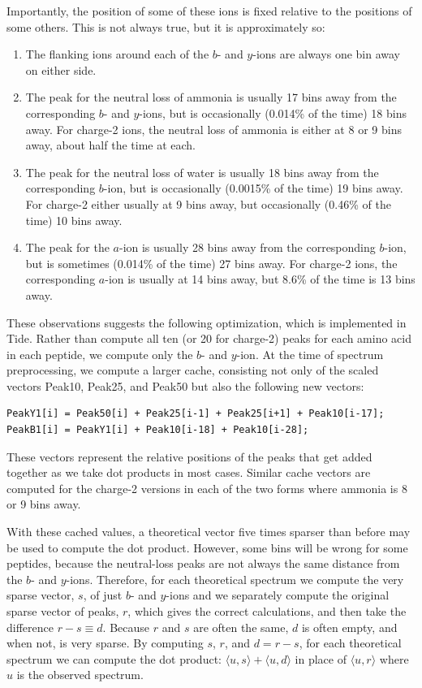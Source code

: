 Importantly, the position of some of these ions is fixed relative
to the positions of some others. This is not always true, but it is
approximately so:
\begin{enumerate}
\item The flanking ions around each of the $b$- and $y$-ions are always
  one bin away on either side.
\item The peak for the neutral loss of ammonia is usually 17 bins away
  from the corresponding $b$- and $y$-ions, but is occasionally (0.014\%
  of the time) 18 bins away. For charge-2 ions, the neutral loss of
  ammonia is either at 8 or 9 bins away, about half the time at each.
\item The peak for the neutral loss of water is usually 18 bins away
  from the corresponding $b$-ion, but is occasionally (0.0015\% of the
  time) 19 bins away. For charge-2 %
  either usually at 9 bins away, but occasionally (0.46\% of the time)
  10 bins away.
\item The peak for the $a$-ion is usually 28 bins away from the
  corresponding $b$-ion, but is sometimes (0.014\% of the time) 27 bins
  away. For charge-2 ions, the corresponding $a$-ion is usually at 14
  bins away, but 8.6\% of the time is 13 bins away.
\end{enumerate}
These observations suggests the following optimization, which is implemented in
Tide. Rather than compute all ten (or 20 for charge-2) peaks for each
amino acid in each peptide, we compute only the $b$- and $y$-ion. At the
time of spectrum preprocessing, we compute a larger cache, consisting
not only of the scaled vectors Peak10, Peak25, and Peak50 but also the
following new vectors:
\begin{verbatim}
PeakY1[i] = Peak50[i] + Peak25[i-1] + Peak25[i+1] + Peak10[i-17];
PeakB1[i] = PeakY1[i] + Peak10[i-18] + Peak10[i-28];
\end{verbatim}
These vectors represent the relative positions of the peaks that get added
together as we take dot products in most cases. Similar cache vectors
are computed for the charge-2 versions in each of the two forms where
ammonia is 8 or 9 bins away.

With these cached values, a theoretical vector five times sparser than
before may be used to compute the dot product. However, some bins
will be wrong for some peptides, because the neutral-loss peaks
are not always the same distance from the $b$- and $y$-ions. Therefore,
for each theoretical spectrum we compute the very sparse vector, $s$,
of just $b$- and $y$-ions and we separately compute the original sparse
vector of peaks, $r$, which gives the correct calculations, and then
take the difference $r-s \equiv d$. Because $r$ and $s$ are often the same, $d$ is
often empty, and when not, is very sparse. By computing $s$, $r$, and $d =
r-s$, for each theoretical spectrum we can compute the dot product:
$\langle u,s \rangle + \langle u,d\rangle$ in place of $\langle u,r
\rangle$ where $u$ is the observed spectrum.

